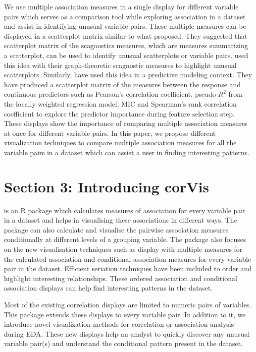 We use multiple association measures in a single display for different
variable pairs which serves as a comparison tool while exploring
association in a dataset and assist in identifying unusual variable
pairs. These multiple measures can be displayed in a scatterplot matrix
similar to what \citet{tukey1985computer} proposed. They suggested that
scatterplot matrix of the scagnostics measures, which are measures
summarizing a scatterplot, can be used to identify unusual scatterplots
or variable pairs. \citet{wilkinson2005graph} used this idea with their
graph-theoretic scagnostic measures to highlight unusual scatterplots.
Similarly, \citet{kuhn2013applied} have used this idea in a predictive
modeling context. They have produced a scatterplot matrix of the
measures between the response and continuous predictors such as
Pearson's correlation coefficient, pseudo-\(R^2\) from the locally
weighted regression model, MIC and Spearman's rank correlation
coefficient to explore the predictor importance during feature selection
step. These displays show the importance of comparing multiple
association measures at once for different variable pairs. In this
paper, we propose different visualization techniques to compare multiple
association measures for all the variable pairs in a dataset which can
assist a user in finding interesting patterns.

\hypertarget{section-3-introducing-corvis}{%
\section{Section 3: Introducing
corVis}\label{section-3-introducing-corvis}}

 is an R package which calculates measures of
association for every variable pair in a dataset and helps in
visualising these associations in different ways. The package can also
calculate and visualise the pairwise association measures conditionally
at different levels of a grouping variable. The package also focuses on
the new visualisation techniques such as display with multiple measures
for the calculated association and conditional association measures for
every variable pair in the dataset. Efficient seriation techniques have
been included to order and highlight interesting relationships. These
ordered association and conditional association displays can help find
interesting patterns in the dataset.

Most of the existing correlation displays are limited to numeric pairs
of variables. This package extends these displays to every variable
pair. In addition to it, we introduce novel visualization methods for
correlation or association analysis during EDA. These new displays help
an analyst to quickly discover any unusual variable pair(s) and
understand the conditional pattern present in the dataset.

